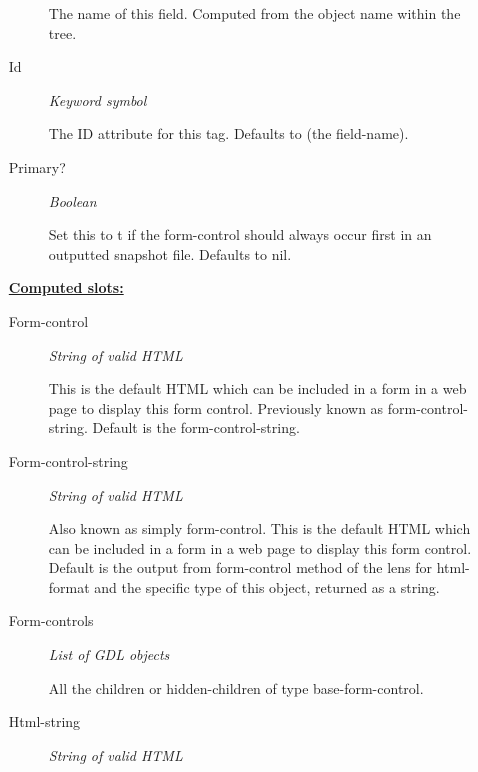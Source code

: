 \documentclass [11pt]{book}
\begin{document}
\begin{itemize}
\begin{description}
 The name of this field. Computed from the object name within the tree.




\item [Id]
\emph{Keyword symbol}

 The ID attribute for this tag. Defaults to (the field-name).




\item [Primary?]
\emph{Boolean}

 Set this to t if the form-control should always occur first in an outputted snapshot file.
Defaults to nil.




\end{description}






\textbf{
\underline{Computed slots:}}

\begin{description}

\item [Form-control]
\emph{String of valid HTML}

 This is the default HTML which can be included in a form in a web page to display this form control.
Previously known as form-control-string. Default is the form-control-string.




\item [Form-control-string]
\emph{String of valid HTML}

 Also known as simply form-control.
This is the default HTML which can be included in a form in a web page to display this form control.
Default is the output from form-control method of the lens for html-format and the
specific type of this object, returned as a string.




\item [Form-controls]
\emph{List of GDL objects}

 All the children or hidden-children
of type base-form-control.




\item [Html-string]
\emph{String of valid HTML}


\end{description}
\end{itemize}
\end{document}
